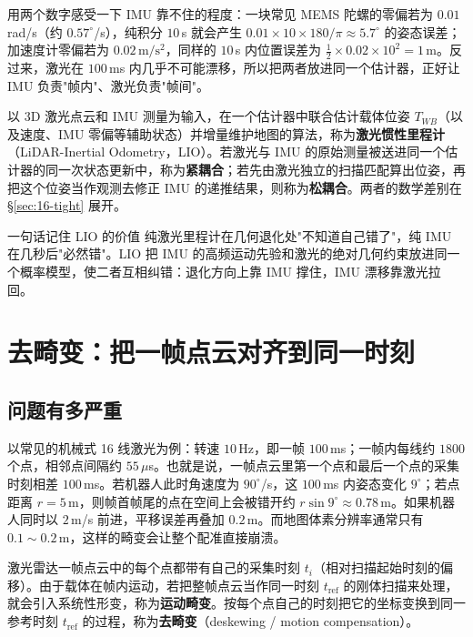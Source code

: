 用两个数字感受一下 IMU 靠不住的程度：一块常见 MEMS 陀螺的零偏若为 $0.01$\,rad/s（约 $0.57^{\circ}$/s），纯积分 $10$\,s 就会产生 $0.01\times10\times180/\pi\approx5.7^{\circ}$ 的姿态误差；加速度计零偏若为 $0.02\,\mathrm{m/s^2}$，同样的 $10$\,s 内位置误差为 $\frac{1}{2}\times0.02\times10^2=1$\,m。反过来，激光在 $100$\,ms 内几乎不可能漂移，所以把两者放进同一个估计器，正好让 IMU 负责"帧内"、激光负责"帧间"。

\begin{definition}
以 3D 激光点云和 IMU 测量为输入，在一个估计器中联合估计载体位姿 $T_{WB}$（以及速度、IMU 零偏等辅助状态）并增量维护地图的算法，称为\textbf{激光惯性里程计}（LiDAR-Inertial Odometry，LIO）。若激光与 IMU 的原始测量被送进同一个估计器的同一次状态更新中，称为\textbf{紧耦合}；若先由激光独立的扫描匹配算出位姿，再把这个位姿当作观测去修正 IMU 的递推结果，则称为\textbf{松耦合}。两者的数学差别在 \S\ref{sec:16-tight} 展开。
\end{definition}

\begin{keybox}{一句话记住 LIO 的价值}
纯激光里程计在几何退化处"不知道自己错了"，纯 IMU 在几秒后"必然错"。LIO 把 IMU 的高频运动先验和激光的绝对几何约束放进同一个概率模型，使二者互相纠错：退化方向上靠 IMU 撑住，IMU 漂移靠激光拉回。
\end{keybox}

\section{去畸变：把一帧点云对齐到同一时刻}\label{sec:16-deskew}

\subsection{问题有多严重}

以常见的机械式 16 线激光为例：转速 $10$\,Hz，即一帧 $100$\,ms；一帧内每线约 $1800$ 个点，相邻点间隔约 $55\,\mu$s。也就是说，一帧点云里第一个点和最后一个点的采集时刻相差 $100$\,ms。若机器人此时角速度为 $90^{\circ}$/s，这 $100$\,ms 内姿态变化 $9^{\circ}$；若点距离 $r=5$\,m，则帧首帧尾的点在空间上会被错开约 $r\sin9^{\circ}\approx0.78$\,m。如果机器人同时以 $2$\,m/s 前进，平移误差再叠加 $0.2$\,m。而地图体素分辨率通常只有 $0.1\sim0.2$\,m，这样的畸变会让整个配准直接崩溃。

\begin{definition}[运动畸变与去畸变]
激光雷达一帧点云中的每个点都带有自己的采集时刻 $t_i$（相对扫描起始时刻的偏移）。由于载体在帧内运动，若把整帧点云当作同一时刻 $t_{\mathrm{ref}}$ 的刚体扫描来处理，就会引入系统性形变，称为\textbf{运动畸变}。按每个点自己的时刻把它的坐标变换到同一参考时刻 $t_{\mathrm{ref}}$ 的过程，称为\textbf{去畸变}（deskewing / motion compensation）。
\end{definition}

